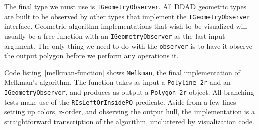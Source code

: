 The final type we must use is \texttt{IGeometryObserver}. All DDAD geometric
types are built to be observed by other types that implement the
\texttt{IGeometryObserver} interface. Geometric algorithm implementations that
wish to be visualized will usually be a free function with an
\texttt{IGeometryObserver} as the last input argument. The only thing we need to
do with the \texttt{observer} is to have it observe the output polygon before we
perform any operations it.

Code listing~\ref{melkman-function} shows \texttt{Melkman}, the final 
implementation of Melkman's algorithm. The function takes as input a 
\texttt{Polyline\_2r} and an \texttt{IGeometryObserver}, and produces as output
a \texttt{Polygon\_2r} object. All branching tests make use of the
\texttt{RIsLeftOrInsidePQ} predicate. Aside from a few lines setting up colors,
z-order, and observing the output hull, the implementation is a straightforward
transcription of the algorithm, uncluttered by visualization code. 
 


% 

% 
% 
% 



